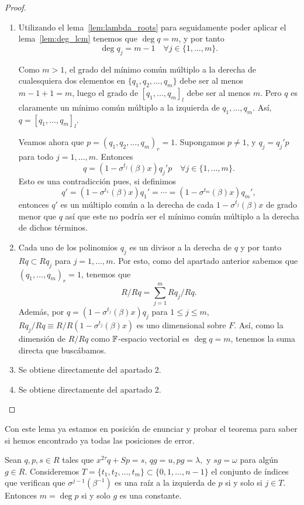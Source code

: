 \begin{proof}
\begin{enumerate}
    \item Utilizando el lema~\ref{lem:lambda_roots} para seguidamente poder aplicar el lema~\ref{lem:deg_lcm} tenemos que \(\deg q = m\), y por tanto
    \[
    \deg q_j = m-1 \quad \forall j \in \{1, \ldots, m\}.
    \]

    Como \(m > 1\), el grado del mínimo común múltiplo a la derecha de cualesquiera dos elementos en \(\{q_1, q_2, \ldots, q_m\}\) debe ser al menos \(m - 1 + 1 = m\), luego el grado de  \({[q_1, \ldots, q_m]}_l\) debe ser al menos \(m\). Pero \(q\) es claramente un mínimo común múltiplo a la izquierda de  \(q_1, \ldots, q_m\). Así, \(q = {[q_1, \ldots, q_m]}_l \).

Veamos ahora que \(p = {(q_1, q_2, \ldots, q_m)}_r = 1\). Supongamos \(p \neq 1\), y  \(q_j = q_j'p\) para todo \(j = 1, \ldots, m\). Entonces
\[
q = (1 - \sigma^{t_j}(\beta)x)q_j'p \quad \forall j \in \{1, \ldots, m\}
.\]
Esto es una contradicción pues, si definimos
\[
q' = (1 - \sigma^{t_1}(\beta)x)q_1' = \cdots = (1 - \sigma^{t_m}(\beta)x)q_m'
,\]
entonces \(q'\) es un múltiplo común a la derecha de cada \(1 - \sigma^{t_j}(\beta)x\) de grado menor que \(q\) así que este no podría ser el mínimo común múltiplo a la derecha de dichos términos.
    \item Cada uno de los polinomios \(q_j\) es un divisor a la derecha de \(q\) y por tanto \(Rq \subset Rq_j\) para \(j = 1, \ldots, m\). Por esto, como del apartado anterior sabemos que \({(q_1, \ldots, q_m)}_r = 1\), tenemos que
    \[
    R/Rq = \sum_{j=1}^{m} Rq_j/Rq
    .\]
Además, por \(q = (1 - \sigma^{t_j}(\beta)x)q_j\) para \(1 \le j \le m\),  \(Rq_j / Rq \equiv R / R(1-\sigma^{t_j}(\beta)x)\) es uno dimensional sobre \(F\). Así, como la dimensión de \(R / Rq\) como  \(\mathbb{F}\)-espacio vectorial es  \(\deg q = m\), tenemos la suma directa que buscábamos.

    \item Se obtiene directamente del apartado 2.
    \item Se obtiene directamente del apartado 2.
\end{enumerate}
\end{proof}

Con este lema ya estamos en posición de enunciar y probar el teorema para saber si hemos encontrado ya todas las posiciones de error.

\begin{theorem}
\label{th:failure_cond}
    Sean \(q, p, s \in R\)  tales que \(x^{2\tau}q + Sp = s\),  \(qg = u, pg = \lambda, \text{ y  } sg = \omega\) para algún \(g \in R\). Consideremos \(T = \{t_1, t_2, \ldots, t_{m}\} \subset \{0,1, \ldots, n-1\}\) el conjunto de índices que verifican que \(\sigma^{j-1}(\beta^{-1})\) es una raíz a la izquierda de \(p\) si y solo si  \(j \in T\). Entonces \(m = \deg p \) si y solo \(g\) es una constante.
\end{theorem}


